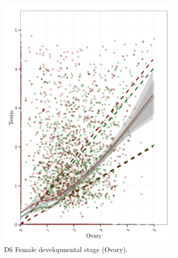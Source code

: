 \documentclass[11pt,twoside,a4paper]{report}
\begin{document}
		\begin{figure}
			\centering
			\begin{subfigure}{.5\textwidth}
				\centering
				\includegraphics[width=1\linewidth]{pngs/E2F_specific_Female_expression.png}
				\caption{D6 Female developmental stage (Ovary).}
			\end{subfigure}%
			\begin{subfigure}{.5\textwidth}
				\centering

\end{subfigure}
\end{figure}
\end{document}
